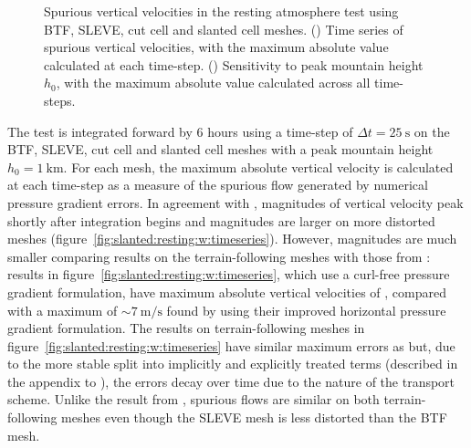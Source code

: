 \begin{figure}
	\centering
	\begin{subfigure}{\textwidth}
		\centering
		
		\label{fig:slanted:resting:w:timeseries}
		\label{fig:slanted:resting:w:max}
	\end{subfigure}
	\caption{Spurious vertical velocities in the resting atmosphere test using BTF, SLEVE, cut cell and slanted cell meshes.
	() Time series of spurious vertical velocities, with the maximum absolute value calculated at each time-step. 
	() Sensitivity to peak mountain height $h_0$, with the maximum absolute value calculated across all time-steps.
	}
	\label{fig:slanted:resting:w}
\end{figure}

The test is integrated forward by \num{6} hours using a time-step of $\Delta t = \SI{25}{\second}$ on the BTF, SLEVE, cut cell and slanted cell meshes with a peak mountain height $h_0 = \SI{1}{\kilo\meter}$.
For each mesh, the maximum absolute vertical velocity is calculated at each time-step as a measure of the spurious flow generated by numerical pressure gradient errors.  In agreement with \citep{klemp2011}, magnitudes of vertical velocity peak shortly after integration begins and magnitudes are larger on more distorted meshes (figure~\ref{fig:slanted:resting:w:timeseries}).
However, magnitudes are much smaller comparing results on the terrain-following meshes with those from \citet{klemp2011}: results in figure~\ref{fig:slanted:resting:w:timeseries}, which use a curl-free pressure gradient formulation, have maximum absolute vertical velocities of \unskip, compared with a maximum of $\sim \SI{7}{\meter\per\second}$ found by \citet{klemp2011} using their improved horizontal pressure gradient formulation.
The results on terrain-following meshes in figure~\ref{fig:slanted:resting:w:timeseries} have similar maximum errors as \citet{weller-shahrokhi2014} but, due to the more stable split into implicitly and explicitly treated terms (described in the appendix to \citet{shaw-weller2016}), the errors decay over time due to the  nature of the transport scheme.
Unlike the result from \citet{klemp2011}, spurious flows are similar on both terrain-following meshes even though the SLEVE mesh is less distorted than the BTF mesh.

